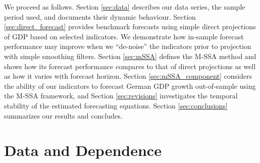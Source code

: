 \documentclass[11pt,a4paper]{article}
\begin{document}

We proceed as follows. Section \eqref{sec:data} describes our data series, the sample period used, and documents their dynamic behaviour. Section \eqref{sec:direct_forecast} provides benchmark forecasts using simple direct projections of GDP based on selected indicators. We demonstrate how in-sample forecast performance may improve when we ``de-noise'' the indicators prior to projection with simple smoothing filters. Section \eqref{sec:mSSA} defines the M-SSA method and shows how its forecast performance compares to that of direct projections as well as how it varies with forecast horizon. 
Section \eqref{sec:mSSA_component} considers the ability of our indicators to forecast German GDP growth out-of-sample using the M-SSA framework, and Section \eqref{sec:revisions} investigates the temporal stability of the estimated forecasting equations. 
Section \eqref{sec:conclusions} summarizes our results and concludes.



\section{Data and Dependence}\label{sec:data}
\end{document}
